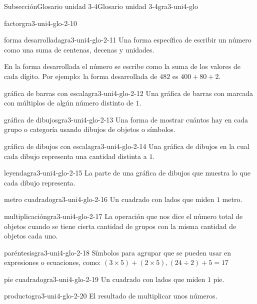 \begin{subsectionptx}{Subsección}{Glosario unidad 3-4}{}{Glosario unidad 3-4}{}{}{gra3-uni4-glo}
\begin{descriptionlist}
\begin{dlimedium}{factor}{gra3-uni4-glo-2-10}
\end{dlimedium}%
\begin{dlimedium}{forma desarrollada}{gra3-uni4-glo-2-11}%
Una forma específica de escribir un número como una suma de centenas, decenas y unidades.%
\par
En la forma desarrollada el número se escribe como la suma de los valores de cada dígito. Por ejemplo: la forma desarrollada de \(482\) es \(400 + 80 + 2\).%
\end{dlimedium}%
\begin{dlimedium}{gráfica de barras con escala}{gra3-uni4-glo-2-12}%
Una gráfica de barras con marcada con múltiplos de algún número distinto de \(1\).%
\end{dlimedium}%
\begin{dlimedium}{gráfica de dibujos}{gra3-uni4-glo-2-13}%
Una forma de mostrar cuántos hay en cada grupo o categoría usando dibujos de objetos o símbolos.%
\end{dlimedium}%
\begin{dlimedium}{gráfica de dibujos con escala}{gra3-uni4-glo-2-14}%
Una gráfica de dibujos en la cual cada dibujo representa una cantidad distinta a \(1\).%
\end{dlimedium}%
\begin{dlimedium}{leyenda}{gra3-uni4-glo-2-15}%
La parte de una gráfica de dibujos que muestra lo que cada dibujo representa.%
\end{dlimedium}%
\begin{dlimedium}{metro cuadrado}{gra3-uni4-glo-2-16}%
Un cuadrado con lados que miden \(1\) metro.%
\end{dlimedium}%
\begin{dlimedium}{multiplicación}{gra3-uni4-glo-2-17}%
La operación que nos dice el número total de objetos cuando se tiene cierta cantidad de grupos con la misma cantidad de objetos cada uno.%
\end{dlimedium}%
\begin{dlimedium}{paréntesis}{gra3-uni4-glo-2-18}%
Símbolos para agrupar que se pueden usar en expresiones o ecuaciones, como: \((3 \times 5) + (2 \times 5), (24 \div 2) + 5 = 17\)%
\end{dlimedium}%
\begin{dlimedium}{pie cuadrado}{gra3-uni4-glo-2-19}%
Un cuadrado con lados que miden \(1\) pie.%
\end{dlimedium}%
\begin{dlimedium}{producto}{gra3-uni4-glo-2-20}%
El resultado de multiplicar unos números.%
\end{dlimedium}%

\end{descriptionlist}
\end{subsectionptx}
